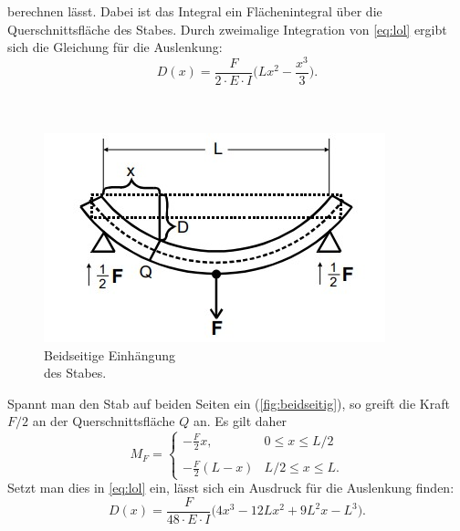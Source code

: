 berechnen lässt. Dabei ist das Integral ein Flächenintegral über die Querschnittsfläche des Stabes.
Durch zweimalige Integration von \autoref{eq:lol} ergibt sich die Gleichung für die Auslenkung:
\begin{equation*}
    D(x) = \frac{F}{2 \cdot E \cdot I} \biggl(Lx^2 - \frac{x^3}{3}\biggr).
\end{equation*}
\\
\\
\begin{minipage}[4cm]{0.45\textwidth}
    \begin{figure}[H]
        \includegraphics[width=\linewidth]{img/abb4.jpg}
        \caption{Beidseitige Einhängung \\des Stabes.\cite{V103}}
        \label{fig:beidseitig}
    \end{figure}
    \vspace{10pt}
    \end{minipage}
    \begin{minipage}[4cm]{0.55\textwidth}
        Spannt man den Stab auf beiden Seiten ein (\autoref{fig:beidseitig}), so greift die Kraft $F/2$ an der Querschnittsfläche $Q$ an.
        Es gilt daher
        \begin{equation*}
            M_F = 
            \begin{cases}
                -\frac{F}{2}x, & 0 \leq x \leq L/2 \\
                \\
                -\frac{F}{2}(L-x) & L/2 \leq x \leq L.
            \end{cases}
        \end{equation*}
        Setzt man dies in \autoref{eq:lol} ein, lässt sich ein Ausdruck für die Auslenkung finden:
        \begin{equation*}
            D(x) = \frac{F}{48 \cdot E \cdot I} \biggl(4x^3 - 12Lx^2 + 9L^2x - L^3\biggr).
        \end{equation*}
        \vspace{10pt}
    \end{minipage}
    \newpage